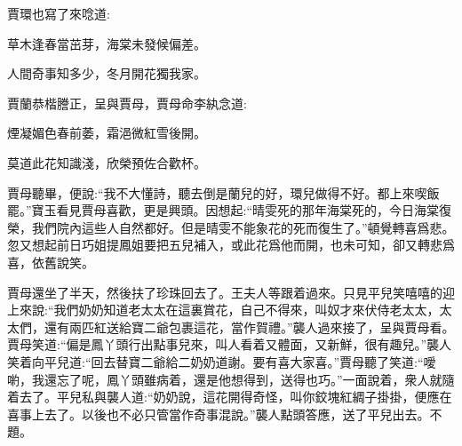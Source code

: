 \begin{parag}
    賈環也寫了來唸道:
\end{parag}

\begin{poem}
    \begin{pl}
        草木逢春當茁芽，海棠未發候偏差。
    \end{pl}


    \begin{pl}
        人間奇事知多少，冬月開花獨我家。
    \end{pl}
\end{poem}


\begin{parag}
    賈蘭恭楷謄正，呈與賈母，賈母命李紈念道:
\end{parag}


\begin{poem}


    \begin{pl}
        煙凝媚色春前萎，霜浥微紅雪後開。
    \end{pl}


    \begin{pl}
        莫道此花知識淺，欣榮預佐合歡杯。
    \end{pl}

\end{poem}

\begin{parag}
    賈母聽畢，便說:“我不大懂詩，聽去倒是蘭兒的好，環兒做得不好。都上來喫飯罷。”寶玉看見賈母喜歡，更是興頭。因想起:“晴雯死的那年海棠死的，今日海棠復榮，我們院內這些人自然都好。但是晴雯不能象花的死而復生了。”頓覺轉喜爲悲。忽又想起前日巧姐提鳳姐要把五兒補入，或此花爲他而開，也未可知，卻又轉悲爲喜，依舊說笑。
\end{parag}


\begin{parag}
    賈母還坐了半天，然後扶了珍珠回去了。王夫人等跟着過來。只見平兒笑嘻嘻的迎上來說:“我們奶奶知道老太太在這裏賞花，自己不得來，叫奴才來伏侍老太太，太太們，還有兩匹紅送給寶二爺包裹這花，當作賀禮。”襲人過來接了，呈與賈母看。賈母笑道:“偏是鳳丫頭行出點事兒來，叫人看着又體面，又新鮮，很有趣兒。”襲人笑着向平兒道:“回去替寶二爺給二奶奶道謝。要有喜大家喜。”賈母聽了笑道:“噯喲，我還忘了呢，鳳丫頭雖病着，還是他想得到，送得也巧。”一面說着，衆人就隨着去了。平兒私與襲人道:“奶奶說，這花開得奇怪，叫你鉸塊紅綢子掛掛，便應在喜事上去了。以後也不必只管當作奇事混說。”襲人點頭答應，送了平兒出去。不題。
\end{parag}



